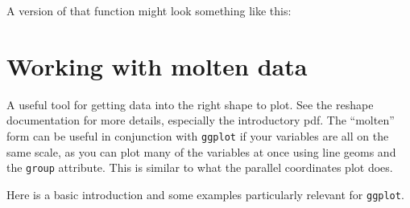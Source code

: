 A \ggplot version of that function might look something like this:


\section{Working with molten data}
\label{sec:reshape}

A useful tool for getting data into the right shape to plot.  See the reshape documentation for more details, especially the introductory pdf.  The ``molten'' form can be useful in conjunction with {\tt ggplot} if your variables are all on the same scale, as you can plot many of the variables at once using line geoms and the {\tt group} attribute.  This is similar to what the parallel coordinates plot does.

Here is a basic introduction and some examples particularly relevant for {\tt ggplot}.

% 
% 



